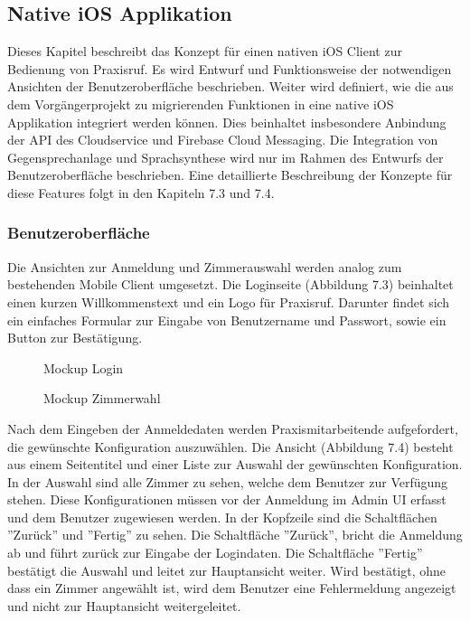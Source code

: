 \subsection{Native iOS Applikation}

Dieses Kapitel beschreibt das Konzept für einen nativen iOS Client zur Bedienung von Praxisruf.
Es wird Entwurf und Funktionsweise der notwendigen Ansichten der Benutzeroberfläche beschrieben.
Weiter wird definiert, wie die aus dem Vorgängerprojekt zu migrierenden Funktionen in eine native iOS Applikation integriert werden können.
Dies beinhaltet insbesondere Anbindung der API des Cloudservice und Firebase Cloud Messaging.
Die Integration von Gegensprechanlage und Sprachsynthese wird nur im Rahmen des Entwurfs der Benutzeroberfläche beschrieben.
Eine detaillierte Beschreibung der Konzepte für diese Features folgt in den Kapiteln 7.3 und 7.4.


\subsubsection{Benutzeroberfläche}

Die Ansichten zur Anmeldung und Zimmerauswahl werden analog zum bestehenden Mobile Client umgesetzt.
Die Loginseite (Abbildung 7.3) beinhaltet einen kurzen Willkommenstext und ein Logo für Praxisruf.
Darunter findet sich ein einfaches Formular zur Eingabe von Benutzername und Passwort, sowie ein Button zur Bestätigung.

\begin{figure}[h]
    \centering
    \begin{minipage}[b]{0.4\textwidth}
        \caption{Mockup Login}
    \end{minipage}
    \hfill
    \begin{minipage}[b]{0.4\textwidth}
        \caption{Mockup Zimmerwahl}
    \end{minipage}\label{fig:Mockups-Login-ClientSelection}
\end{figure}

Nach dem Eingeben der Anmeldedaten werden Praxismitarbeitende aufgefordert, die gewünschte Konfiguration auszuwählen.
Die Ansicht (Abbildung 7.4) besteht aus einem Seitentitel und einer Liste zur Auswahl der gewünschten Konfiguration.
In der Auswahl sind alle Zimmer zu sehen, welche dem Benutzer zur Verfügung stehen.
Diese Konfigurationen müssen vor der Anmeldung im Admin UI erfasst und dem Benutzer zugewiesen werden.
In der Kopfzeile sind die Schaltflächen ''Zurück'' und ''Fertig'' zu sehen.
Die Schaltfläche ''Zurück'', bricht die Anmeldung ab und führt zurück zur Eingabe der Logindaten.
Die Schaltfläche ''Fertig'' bestätigt die Auswahl und leitet zur Hauptansicht weiter.
Wird bestätigt, ohne dass ein Zimmer angewählt ist, wird dem Benutzer eine Fehlermeldung angezeigt und nicht zur Hauptansicht weitergeleitet.

